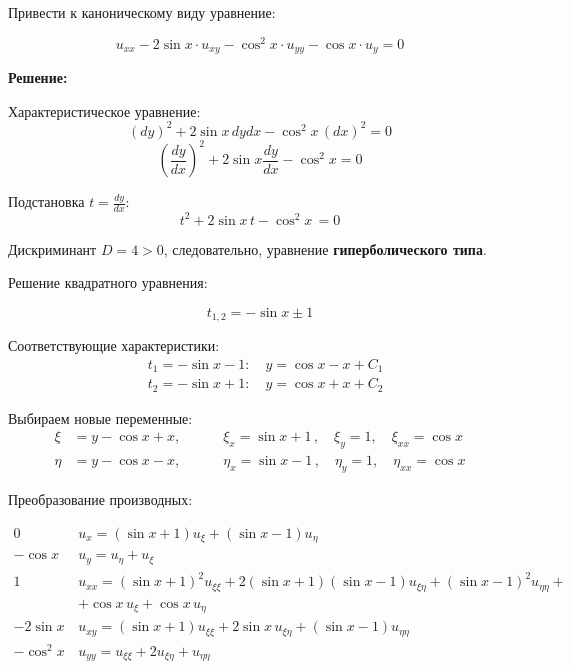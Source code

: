 \documentclass[a4paper,12pt]{article}
\begin{document}
Привести к каноническому виду уравнение:

\begin{equation*}
    u_{xx} - 2 \sin x \cdot u_{xy} - \cos^2 x \cdot u_{yy} - \cos x \cdot u_y = 0
\end{equation*}

\textbf{Решение:}

Характеристическое уравнение:
\begin{equation*}
    {(dy)}^2 + 2 \sin x \, {dy}{dx} - \cos^2 x \, {(dx)}^2 = 0
\end{equation*}
\begin{equation*}
    \left( \frac{dy}{dx} \right)^2 + 2 \sin x \frac{dy}{dx} - \cos^2 x = 0
\end{equation*}

Подстановка $t = \frac{dy}{dx}$:
\begin{equation*}
    t^2 + 2 \sin x \, t - \cos^2 x \,= 0 
\end{equation*}

Дискриминант $D = 4 > 0$, следовательно, уравнение \textbf{гиперболического типа}.

Решение квадратного уравнения:

\begin{equation*}
    t_{1,2} = - \sin x \pm 1
\end{equation*}

Соответствующие характеристики:
\begin{align*}
    &t_1 = - \sin x - 1: \quad y = \cos x - x + C_1 \\
    &t_2 = - \sin x + 1: \quad y = \cos x + x + C_2
\end{align*}

Выбираем новые переменные:
\begin{align*}
     \xi &= y - \cos x + x,  \quad \quad \quad \xi_x = \sin x + 1 \, ,  \quad \xi_y = 1, \quad \xi_{xx} = \cos x\\
     \eta &= y - \cos x - x, \quad \quad \quad \eta_x = \sin x - 1 \, ,  \quad \eta_y = 1, \quad \eta_{xx} = \cos x
\end{align*}

Преобразование производных:
\begin{flushleft}
\(
\begin{array}{r|l}
0 & u_x = (\sin x + 1)u_{\xi} + (\sin x - 1)u_{\eta} \\
- \cos x \, & u_y = u_{\eta} + u_{\xi} \\
1 & u_{xx} = (\sin x + 1)^2u_{\xi\xi} + 2(\sin x + 1)(\sin x - 1)u_{\xi\eta} + (\sin x - 1)^2u_{\eta\eta} + \\ & + \cos x \,u_{\xi} + \cos x \,u_{\eta}\\
- 2 \sin x \, & u_{xy} = (\sin x + 1) u_{\xi\xi} + 2 \sin x \, u_{\xi\eta} + (\sin x - 1) u_{\eta\eta} \\
- \cos^2 x \, & u_{yy} = u_{\xi\xi} + 2u_{\xi\eta} + u_{\eta\eta} \\
\end{array}
\)
\end{flushleft}
\end{document}
